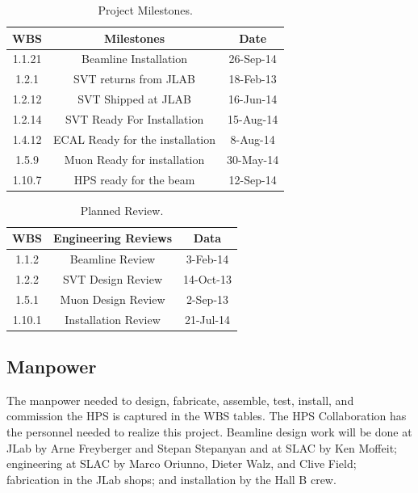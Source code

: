 \begin{table}[htdp]
\caption{Project Milestones.}
\begin{center}
\begin{tabular}{|c|c|c|}
\hline
WBS & Milestones & Date\\
\hline\hline
1.1.21&Beamline Installation&26-Sep-14 \\
\hline
1.2.1	&SVT returns from JLAB	&18-Feb-13 \\
\hline
1.2.12&	SVT Shipped at JLAB	&16-Jun-14\\
\hline
1.2.14&	SVT Ready For Installation&	15-Aug-14\\
\hline
1.4.12&	ECAL Ready for the installation&	8-Aug-14\\
\hline
1.5.9	&Muon Ready for installation&	30-May-14\\
\hline
1.10.7&	HPS ready for the beam&	12-Sep-14\\
\hline
\hline
\end{tabular}
\end{center}
\label{tb:milestones}
\end{table}%

\begin{table}[htdp]
\caption{Planned Review.}
\begin{center}
\begin{tabular}{|c|c|c|}
\hline
WBS&Engineering Reviews& Data\\
\hline
\hline
1.1.2 &	Beamline  Review&	3-Feb-14\\
\hline
1.2.2	&SVT Design Review	&14-Oct-13\\
\hline
1.5.1	&Muon Design Review&	2-Sep-13\\
\hline
1.10.1&	Installation Review	&21-Jul-14\\
\hline
\hline
\end{tabular}
\end{center}
\label{tb:reviews}
\end{table}%

\subsection{Manpower}

The manpower needed to design, fabricate, assemble, test, install, and commission the HPS is captured in the WBS tables. The HPS Collaboration has the personnel needed to realize this project. 
Beamline design work will be done at JLab by Arne Freyberger and Stepan Stepanyan and at SLAC by Ken Moffeit; engineering at SLAC by Marco Oriunno, Dieter Walz, and Clive Field; fabrication in the JLab shops; and installation by the Hall B crew. 


